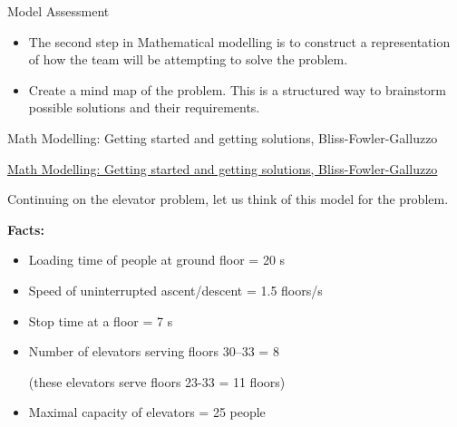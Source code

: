 \newpage


%
%



\begin{module}{Model Assessment}
	\label{analysis}

	
	
\end{module}



\begin{lesson}

	\begin{itemize}
		\item The second step in Mathematical modelling is to construct a representation of how the team will be attempting to solve the problem.
		\item Create a mind map of the problem. This is a structured way to brainstorm possible solutions and their requirements.
	\end{itemize}
	

\begin{annotation}
	\begin{goals}
	Math Modelling: Getting started and getting solutions, Bliss-Fowler-Galluzzo
	
	\hfill {}	
	\end{goals}
\end{annotation}
	 \href{https://m3challenge.siam.org/resources/modeling-handbook}{Math Modelling: Getting started and getting solutions, Bliss-Fowler-Galluzzo}

\end{lesson}




\newpage

\question

Continuing on the elevator problem, let us think of this model for the problem.

\textbf{Facts:}
\begin{itemize}
	\item Loading time of people at ground floor = 20 s
	\item Speed of uninterrupted ascent/descent = 1.5 floors/s
	\item Stop time at a floor = 7 s
	\item Number of elevators serving floors 30--33 = 8

	(these elevators serve floors 23-33 = 11 floors)
	
	\item Maximal capacity of elevators = 25 people
\end{itemize}


